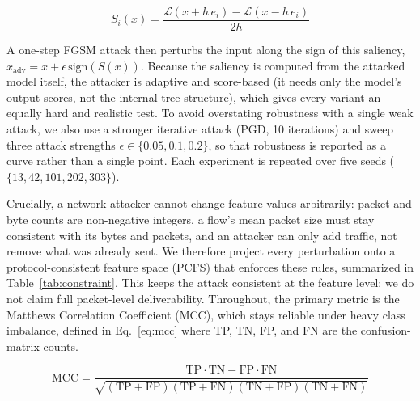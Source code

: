\documentclass[11pt,a4paper]{article}
\begin{document}
\begin{equation}
S_i(x) = \frac{\mathcal{L}(x + h\,e_i) - \mathcal{L}(x - h\,e_i)}{2h}
\label{eq:saliency}
\end{equation}

A one-step FGSM attack then perturbs the input along the sign of this saliency,
$x_{\mathrm{adv}} = x + \epsilon\,\mathrm{sign}(S(x))$. Because the saliency is computed
from the attacked model itself, the attacker is adaptive and score-based (it needs only
the model's output scores, not the internal tree structure), which gives every variant an
equally hard and realistic test. To avoid overstating robustness with a single weak
attack, we also use a stronger iterative attack (PGD, 10 iterations) and sweep three
attack strengths $\epsilon \in \{0.05, 0.1, 0.2\}$, so that robustness is reported as a
curve rather than a single point. Each experiment is repeated over five seeds
($\{13,42,101,202,303\}$).

Crucially, a network attacker cannot change feature values arbitrarily: packet and byte
counts are non-negative integers, a flow's mean packet size must stay consistent with its
bytes and packets, and an attacker can only add traffic, not remove what was already
sent. We therefore project every perturbation onto a protocol-consistent feature space
(PCFS) that enforces these rules, summarized in Table~\ref{tab:constraint}. This keeps the
attack consistent at the feature level; we do not claim full packet-level deliverability.
Throughout, the primary metric is the Matthews Correlation Coefficient (MCC), which stays
reliable under heavy class imbalance, defined in Eq.~\eqref{eq:mcc} where TP, TN, FP, and
FN are the confusion-matrix counts.

\begin{equation}
\mathrm{MCC} = \frac{\mathrm{TP}\cdot\mathrm{TN} - \mathrm{FP}\cdot\mathrm{FN}}
{\sqrt{(\mathrm{TP}{+}\mathrm{FP})(\mathrm{TP}{+}\mathrm{FN})(\mathrm{TN}{+}\mathrm{FP})(\mathrm{TN}{+}\mathrm{FN})}}
\label{eq:mcc}
\end{equation}
\end{document}
